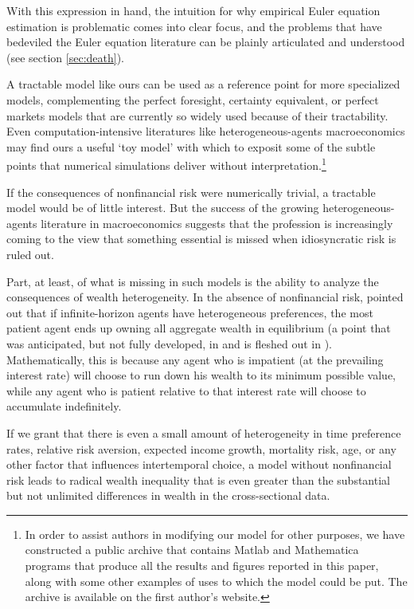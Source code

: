 \documentclass[titlepage,abstract]{\econtex}\newcommand{\texname}{ctDiscrete}
\begin{document}
With this expression in hand, the intuition for why empirical Euler equation
estimation is problematic comes into clear focus, and the problems that have
bedeviled the Euler equation literature can be plainly articulated and
understood (see section \ref{sec:death}).


A tractable model like ours can be used as a reference point for more
specialized models, complementing the perfect foresight, certainty
equivalent, or perfect markets models that are currently so widely
used because of their tractability. Even computation-intensive
literatures like heterogeneous-agents macroeconomics may find ours a
useful `toy model' with which to exposit some of the
subtle points that numerical simulations deliver without
interpretation.\footnote{In order to assist authors in modifying our
  model for other purposes, we have constructed a public archive that
  contains Matlab and Mathematica programs that produce all the
  results and figures reported in this paper, along with some other
  examples of uses to which the model could be put.  The archive is
  available on the first author's website.}

  If the consequences of nonfinancial risk were numerically
  trivial, a tractable model would be of little interest.  But the
  success of the growing heterogeneous-agents literature in
  macroeconomics suggests that the profession is increasingly coming
  to the view that something essential is missed when idiosyncratic
  risk is ruled out.

  Part, at least, of what is missing in such models is the ability to
  analyze the consequences of wealth heterogeneity.  In the absence of
  nonfinancial risk, \cite{uzawa:patientownall} pointed out that if
  infinite-horizon agents have heterogeneous preferences, the most
  patient agent ends up owning all aggregate wealth in equilibrium (a point 
that was anticipated, but not fully developed, in \cite{ramsey:save} and is
fleshed out in \cite{beckerWealth}).  
  Mathematically, this is because any agent who is impatient (at the
  prevailing interest rate) will choose to run down his wealth to its
  minimum possible value, while any agent who is patient relative to
  that interest rate will choose to accumulate indefinitely.
  

  If we grant that there is even a small amount of heterogeneity in
  time preference rates, relative risk aversion, expected income
  growth, mortality risk, age, or any other factor that influences
  intertemporal choice, a model without nonfinancial risk leads to
  radical wealth inequality that is even greater than 
  the substantial but not unlimited differences in wealth in the
  cross-sectional data.
  
\end{document}
